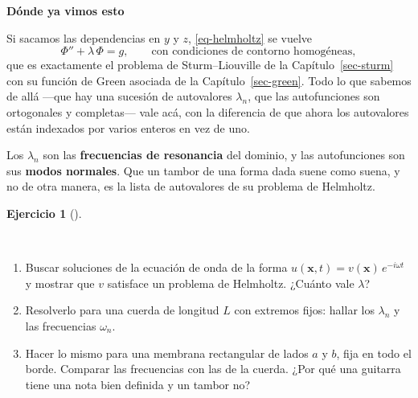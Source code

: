 \documentclass[
  spanish,
  a4paper,
]{scrbook}
\providecommand{\tightlist}{%
  \setlength{\itemsep}{0pt}\setlength{\parskip}{0pt}}
\theoremstyle{definition}
\theoremstyle{plain}
\theoremstyle{definition}
\theoremstyle{plain}
\theoremstyle{definition}
\newtheorem{exercise}{Ejercicio}[chapter]
\theoremstyle{remark}
\begin{document}
\begin{tcolorbox}[enhanced jigsaw, arc=.35mm, bottomrule=.15mm, breakable, colback=white, colframe=quarto-callout-tip-color-frame, left=2mm, leftrule=.75mm, opacityback=0, rightrule=.15mm, toprule=.15mm]
\begin{minipage}[t]{5.5mm}
\textcolor{quarto-callout-tip-color}{\faLightbulb}
\end{minipage}%
\begin{minipage}[t]{\textwidth - 5.5mm}

\vspace{-3mm}\textbf{Dónde ya vimos esto}\vspace{3mm}

Si sacamos las dependencias en \(y\) y \(z\), \ref{eq-helmholtz} se
vuelve
\[\Phi'' + \lambda\,\Phi = g, \qquad \text{con condiciones de contorno homogéneas},\]
que es exactamente el problema de Sturm--Liouville de la
Capítulo~\ref{sec-sturm} con su función de Green asociada de la
Capítulo~\ref{sec-green}. Todo lo que sabemos de allá ---que hay una
sucesión de autovalores \(\lambda_n\), que las autofunciones son
ortogonales y completas--- vale acá, con la diferencia de que ahora los
autovalores están indexados por varios enteros en vez de uno.

Los \(\lambda_n\) son las \textbf{frecuencias de resonancia} del
dominio, y las autofunciones son sus \textbf{modos normales}. Que un
tambor de una forma dada suene como suena, y no de otra manera, es la
lista de autovalores de su problema de Helmholtz.

\end{minipage}%
\end{tcolorbox}

\begin{exercise}[]\protect\hypertarget{exr-helmholtz-modos}{}\label{exr-helmholtz-modos}

~

\begin{enumerate}
\def\labelenumi{\alph{enumi}.}
\tightlist
\item
  Buscar soluciones de la ecuación de onda de la forma
  \(u(\mathbf{x},t) = v(\mathbf{x})\,e^{-i\omega t}\) y mostrar que
  \(v\) satisface un problema de Helmholtz. ¿Cuánto vale \(\lambda\)?
\item
  Resolverlo para una cuerda de longitud \(L\) con extremos fijos:
  hallar los \(\lambda_n\) y las frecuencias \(\omega_n\).
\item
  Hacer lo mismo para una membrana rectangular de lados \(a\) y \(b\),
  fija en todo el borde. Comparar las frecuencias con las de la cuerda.
  ¿Por qué una guitarra tiene una nota bien definida y un tambor no?
\end{enumerate}

\end{exercise}
\end{document}
